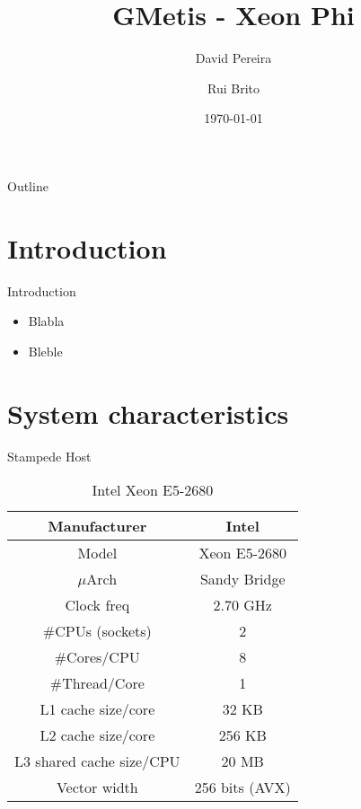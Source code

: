 \documentclass{beamer}
\title{
    GMetis - Xeon Phi
}
\author{
    David Pereira
    \and
    Rui Brito
}
\date{\today}
\begin{document}
\begin{frame}
  \titlepage
\end{frame}

\begin{frame}{Outline}
  \tableofcontents
\end{frame}



\section{Introduction}

\begin{frame}{Introduction}
\begin{itemize}
    \item Blabla
    \item Bleble
\end{itemize}
\end{frame}



\section{System characteristics}

\begin{frame}{Stampede Host}
\begin{table}[H]
\centering
\footnotesize
\begin{tabular}{| c | c |}\hline
Manufacturer & Intel\\ \hline
Model & Xeon E5-2680\\ \hline
$\mu$Arch & Sandy Bridge\\ \hline
Clock freq & 2.70 GHz\\ \hline
\#CPUs (sockets) & 2 \\ \hline
\#Cores/CPU & 8\\ \hline
\#Thread/Core & 1\\ \hline
L1 cache size/core & 32 KB\\ \hline
L2 cache size/core & 256 KB\\ \hline
L3 shared cache size/CPU & 20 MB\\ \hline
Vector width & 256 bits (AVX)\\ \hline
\end{tabular}
\caption{Intel Xeon E5-2680}
\end{table}
\end{frame}
\end{document}
